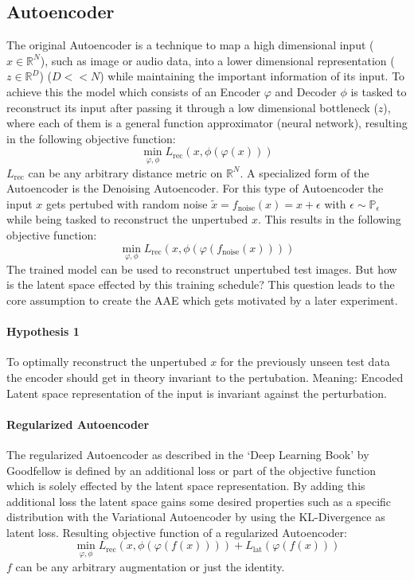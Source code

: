 \documentclass[10pt,a4paper]{article}
\begin{document}
\subsection{Autoencoder}\label{Autoencoder}
The original Autoencoder is a technique to map a high dimensional input ($x \in \mathbb{R}^N$), such as image or audio data, into a lower dimensional representation ($z \in \mathbb{R}^D$) ($D << N$) while maintaining the important information of its input. To achieve this the model which consists of an Encoder $\varphi$ and Decoder $\phi$ is tasked to reconstruct its input after passing it through a low dimensional bottleneck ($z$), where each of them is a general function approximator (neural network), resulting in the following objective function:
\begin{equation}
    \min_{\varphi, \phi} L_{\text{rec}}(x, \phi(\varphi(x)))
\end{equation}
$L_{\text{rec}}$ can be any arbitrary distance metric on $\mathbb{R}^N$. 
A specialized form of the Autoencoder is the  Denoising Autoencoder. For this type of Autoencoder the input $x$ gets pertubed with random noise $\tilde{x} = f_{\text{noise}}(x) =x + \epsilon$ with $\epsilon \sim \mathbb{P}_{\epsilon}$ while being tasked to reconstruct the unpertubed $x$. This results in the following objective function:
\begin{equation}
    \min_{\varphi, \phi} L_{\text{rec}}(x, \phi(\varphi(f_{\text{noise}}(x) )))
\end{equation}
The trained model can be used to reconstruct unpertubed test images. But how is the latent space effected by this training schedule?
This question leads to the core assumption to create the AAE which gets motivated by a later experiment.
\paragraph{Hypothesis 1} To optimally reconstruct the unpertubed $x$ for the previously unseen test data the encoder should get in theory invariant to the pertubation. Meaning: Encoded Latent space representation of the input is invariant against the perturbation.\\
\paragraph{Regularized Autoencoder}
The regularized Autoencoder as described in the `Deep Learning Book' by Goodfellow  \cite{Goodfellow} is defined by an additional loss or part of the objective function which is solely effected by the latent space representation. By adding this additional loss the latent space gains some desired properties such as a specific distribution with the Variational Autoencoder by using the KL-Divergence as latent loss.
Resulting objective function of a regularized Autoencoder:
\begin{equation}
    \min_{\varphi, \phi} L_{\text{rec}}(x, \phi(\varphi(f(x) ))) + L_{\text{lat}}(\varphi(f(x)))
\end{equation}
$f$ can be any arbitrary augmentation or just the identity.
\end{document}
